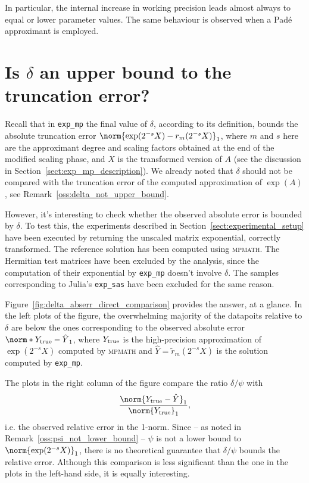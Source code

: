 In particular, the internal increase in working precision leads almost always to equal or lower parameter values. The same behaviour is observed when a Padé approximant is employed.


\section{Is \texorpdfstring{$\delta$}{δ} an upper bound to the truncation error?}\label{sect:is_delta_bound?}
Recall that in \texttt{exp\_mp} the final value of $\delta$, according to its definition, bounds the absolute truncation error $\norm{\exp(2^{-s}X)-r_m(2^{-s}X)}_1$, where $m$ and $s$ here are the approximant degree and scaling factors obtained at the end of the modified scaling phase, and $X$ is the transformed version of $A$ (see the discussion in Section~\ref{sect:exp_mp_description}).
We already noted that $\delta$ should not be compared with the truncation error of the computed approximation of $\exp(A)$, see Remark~\ref{oss:delta_not_upper_bound}.

However, it's interesting to check whether the observed absolute error is bounded by $\delta$.  
To test this, the experiments described in Section~\ref{sect:experimental_setup} have been executed by returning the unscaled matrix exponential, correctly transformed. The reference solution has been computed using \textsc{mpmath}. The Hermitian test matrices have been excluded by the analysis, since the computation of their exponential by \texttt{exp\_mp} doesn't involve $\delta$. The samples corresponding to Julia's \texttt{exp\_sas} have been excluded for the same reason.   

Figure~\ref{fig:delta_abserr_direct_comparison} provides the answer, at a glance. In the left plots of the figure, the overwhelming majority of the datapoits relative to $\delta$ are below the ones corresponding to the observed absolute error $\norm*{Y_{\textup{true}}-\hat{Y}}_1$, where $Y_{\textup{true}}$ is the high-precision approximation of $\exp(2^{-s}X)$ computed by \textsc{mpmath} and $\hat{Y}=\tilde{r}_m(2^{-s}X)$ is the solution computed by \texttt{exp\_mp}. %

The plots in the right column of the figure compare the ratio $\delta/\psi$ with 
\[
	\frac{\norm{Y_{\textup{true}}-\hat{Y}}_1}{\norm{Y_{\textup{true}}}_1},
\]
i.e. the observed relative error in the 1-norm. Since -- as noted in Remark~\ref{oss:psi_not_lower_bound} -- $\psi$ is not a lower bound to $\norm{\exp(2^{-s}X)}_1$, there is no theoretical guarantee that $\delta/\psi$ bounds the relative error. Although this comparison is less significant than the one in the plots in the left-hand side, it is equally interesting.

